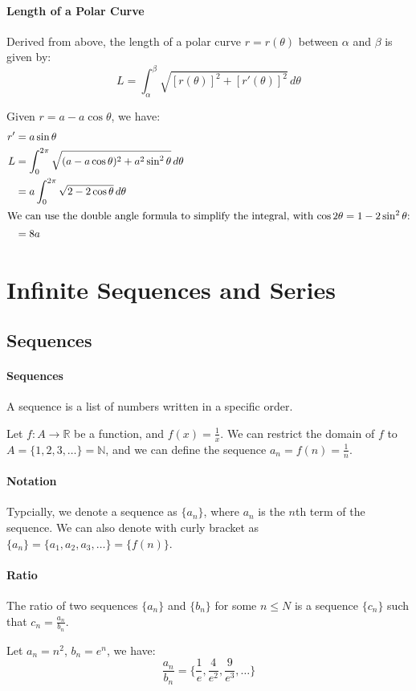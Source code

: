 \documentclass[11pt]{article}
\begin{document}
\paragraph{Length of a Polar Curve} Derived from above, the length of a polar curve $r = r(\theta)$ between $\alpha$ and $\beta$ is given by:
\begin{equation}
    L = \int_{\alpha}^{\beta} \sqrt{[r(\theta)]^2 + [r'(\theta)]^2} \, d\theta
\end{equation}
\begin{example}
    Given $r = a - a\cos \theta$, we have:
    \begin{align*}
        r' &= a\sin \theta \\
        L &= \int_0^{2\pi} \sqrt{(a - a\cos \theta)^2 + a^2\sin^2 \theta} \, d\theta \\
        &= a\int_0^{2\pi} \sqrt{2 - 2\cos \theta} \, d\theta \\
        \intertext{We can use the double angle formula to simplify the integral, with $\cos 2\theta = 1 - 2\sin^2 \theta$:}
        &= 8a
    \end{align*}
\end{example}
\section{Infinite Sequences and Series}
\subsection{Sequences}
\paragraph{Sequences} A sequence is a list of numbers written in a specific order.
\begin{example}
    Let $f: A \to \mathbb{R}$ be a function, and $f(x) = \frac{1}{x}$. We can restrict the domain of $f$ to $A = \{1, 2, 3, \ldots\} = \mathbb{N}$, and we can define the sequence $a_n = f(n) = \frac{1}{n}$.
\end{example}
\paragraph{Notation} Typcially, we denote a sequence as $\{a_n\}$, where $a_n$ is the $n$th term of the sequence. We can also denote with curly bracket as $\{a_n\} = \{a_1, a_2, a_3, \ldots\} = \{f(n)\}$.
\paragraph{Ratio} The ratio of two sequences $\{a_n\}$ and $\{b_n\}$ for some $n \le N$ is a sequence $\{c_n\}$ such that $c_n = \frac{a_n}{b_n}$.
\begin{example}
    Let $a_n = n^2$, $b_n = e^n$, we have:
    $$\frac{a_n}{b_n} = \{\frac{1}{e}, \frac{4}{e^2}, \frac{9}{e^3}, \ldots\}$$
\end{example}
\end{document}
